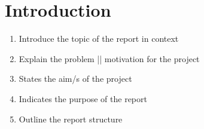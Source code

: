 \section{Introduction}
\begin{enumerate}
    \item Introduce the topic of the report in context
    \item Explain the problem || motivation for the project
    \item States the aim/s of the project
    \item Indicates the purpose of the report
    \item Outline the report structure
\end{enumerate}